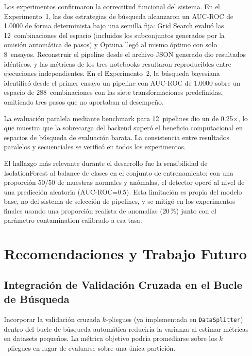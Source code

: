 \documentclass[conference,spanish]{IEEEtran}
\begin{document}
Los experimentos confirmaron la correctitud funcional del sistema. En el
Experimento~1, las dos estrategias de búsqueda alcanzaron un AUC-ROC de
1.0000 de forma determinista bajo una semilla fija: Grid Search evaluó las 12~combinaciones del
espacio (incluidos los subconjuntos generados por la omisión automática de
pasos) y Optuna llegó al mismo óptimo con solo 8~ensayos. Reconstruir el
pipeline desde el archivo JSON generado dio resultados idénticos, y las
métricas de los tres notebooks resultaron reproducibles entre ejecuciones
independientes. En el Experimento~2, la búsqueda bayesiana identificó
desde el primer ensayo un pipeline con AUC-ROC de 1.0000 sobre un espacio
de 288~combinaciones con las siete transformaciones predefinidas,
omitiendo tres pasos que no aportaban al desempeño.

La evaluación paralela mediante benchmark para
12~pipelines dio un de 0.25$\times$, lo que muestra que
la sobrecarga del backend superó el beneficio computacional
en espacios de búsqueda de evaluación barata. La consistencia entre
resultados paralelos y secuenciales se verificó en todos los experimentos.

El hallazgo más relevante durante el desarrollo fue la sensibilidad de
IsolationForest al balance de clases en el conjunto de entrenamiento: con
una proporción 50/50 de muestras normales y anómalas, el detector operó al
nivel de una predicción aleatoria (AUC-ROC=0.5). Esta limitación es
propia del modelo base, no del sistema de selección de pipelines, y se
mitigó en los experimentos finales usando una proporción realista de
anomalías (20\,\%) junto con el parámetro contamination
calibrado a esa tasa.

\section{Recomendaciones y Trabajo Futuro}

\subsection{Integración de Validación Cruzada en el Bucle de Búsqueda}

Incorporar la validación cruzada $k$-pliegues (ya implementada en
\texttt{DataSplitter}) dentro del bucle de búsqueda automática reduciría
la varianza al estimar métricas en datasets pequeños. La métrica
objetivo podría promediarse sobre los $k$~pliegues en lugar de evaluarse
sobre una única partición.
\end{document}
